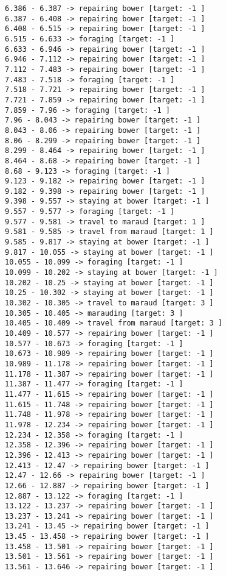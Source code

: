 \documentclass[11pt]{article}
\begin{document}
\begin{Verbatim}[commandchars=\\\{\}]
6.386 - 6.387 -> repairing bower [target: -1 ]
6.387 - 6.408 -> repairing bower [target: -1 ]
6.408 - 6.515 -> repairing bower [target: -1 ]
6.515 - 6.633 -> foraging [target: -1 ]
6.633 - 6.946 -> repairing bower [target: -1 ]
6.946 - 7.112 -> repairing bower [target: -1 ]
7.112 - 7.483 -> repairing bower [target: -1 ]
7.483 - 7.518 -> foraging [target: -1 ]
7.518 - 7.721 -> repairing bower [target: -1 ]
7.721 - 7.859 -> repairing bower [target: -1 ]
7.859 - 7.96 -> foraging [target: -1 ]
7.96 - 8.043 -> repairing bower [target: -1 ]
8.043 - 8.06 -> repairing bower [target: -1 ]
8.06 - 8.299 -> repairing bower [target: -1 ]
8.299 - 8.464 -> repairing bower [target: -1 ]
8.464 - 8.68 -> repairing bower [target: -1 ]
8.68 - 9.123 -> foraging [target: -1 ]
9.123 - 9.182 -> repairing bower [target: -1 ]
9.182 - 9.398 -> repairing bower [target: -1 ]
9.398 - 9.557 -> staying at bower [target: -1 ]
9.557 - 9.577 -> foraging [target: -1 ]
9.577 - 9.581 -> travel to maraud [target: 1 ]
9.581 - 9.585 -> travel from maraud [target: 1 ]
9.585 - 9.817 -> staying at bower [target: -1 ]
9.817 - 10.055 -> staying at bower [target: -1 ]
10.055 - 10.099 -> foraging [target: -1 ]
10.099 - 10.202 -> staying at bower [target: -1 ]
10.202 - 10.25 -> staying at bower [target: -1 ]
10.25 - 10.302 -> staying at bower [target: -1 ]
10.302 - 10.305 -> travel to maraud [target: 3 ]
10.305 - 10.405 -> marauding [target: 3 ]
10.405 - 10.409 -> travel from maraud [target: 3 ]
10.409 - 10.577 -> repairing bower [target: -1 ]
10.577 - 10.673 -> foraging [target: -1 ]
10.673 - 10.989 -> repairing bower [target: -1 ]
10.989 - 11.178 -> repairing bower [target: -1 ]
11.178 - 11.387 -> repairing bower [target: -1 ]
11.387 - 11.477 -> foraging [target: -1 ]
11.477 - 11.615 -> repairing bower [target: -1 ]
11.615 - 11.748 -> repairing bower [target: -1 ]
11.748 - 11.978 -> repairing bower [target: -1 ]
11.978 - 12.234 -> repairing bower [target: -1 ]
12.234 - 12.358 -> foraging [target: -1 ]
12.358 - 12.396 -> repairing bower [target: -1 ]
12.396 - 12.413 -> repairing bower [target: -1 ]
12.413 - 12.47 -> repairing bower [target: -1 ]
12.47 - 12.66 -> repairing bower [target: -1 ]
12.66 - 12.887 -> repairing bower [target: -1 ]
12.887 - 13.122 -> foraging [target: -1 ]
13.122 - 13.237 -> repairing bower [target: -1 ]
13.237 - 13.241 -> repairing bower [target: -1 ]
13.241 - 13.45 -> repairing bower [target: -1 ]
13.45 - 13.458 -> repairing bower [target: -1 ]
13.458 - 13.501 -> repairing bower [target: -1 ]
13.501 - 13.561 -> repairing bower [target: -1 ]
13.561 - 13.646 -> repairing bower [target: -1 ]

\end{Verbatim}
\end{document}
